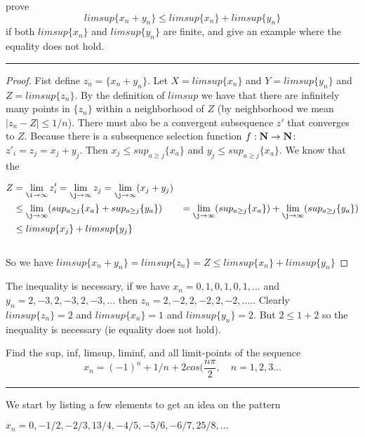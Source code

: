 \documentclass[11pt]{article}
\begin{document}
\newpage
{}

prove
$$limsup\{x_n + y_n\} \leq limsup\{x_n\} + limsup\{y_n\}$$
if both $limsup\{x_n\}$ and $limsup\{y_n\}$ are finite, and give an example where the equality does not hold.

\hrule

\begin{proof}

 Fist define $z_n = \{x_n + y_n\}$. Let $X = limsup\{x_n\}$ and $Y = limsup\{y_n\}$ and $Z = limsup\{z_n\}$. By the definition of $limsup$ we have that there are infinitely many points in $\{z_n\}$ within a neighborhood of $Z$ (by neighborhood we mean $|z_n - Z| \leq 1/n$). There must also be a convergent subsequence  $z'$ that converges to $Z$. Because there is a subsequence selection function $f: \mathbf{N} \to \mathbf{N}$: $z'_i = z_j = x_j + y_j$. Then $x_j \leq sup_{a \geq j}\{x_a\}$ and $y_j \leq sup_{a \geq j}\{x_a\}$. We know that the 
 


\begin{align*}
Z &= \lim_{\i \to \infty} z'_i = \lim_{\j \to \infty} z_j = \lim_{\j \to \infty} (x_j + y_j) \\
&\leq \lim_{\j \to \infty} (sup_{a \geq j}\{x_a\} + sup_{a \geq j}\{y_a\})
&= \lim_{\j \to \infty} (sup_{a \geq j}\{x_a\}) + \lim_{\j \to \infty} (sup_{a \geq j}\{y_a\}) \\
&\leq limsup\{x_j\} + limsup\{y_j\}
\end{align*}
 
$$$$

So we have $limsup\{x_n + y_n\} = limsup\{z_n\} = Z \leq limsup\{x_n\} + limsup\{y_n\}$
\end{proof}

The inequality is necessary, if we have $x_n = 0, 1, 0, 1, 0, 1, ...$ and $y_n = 2, -3, 2, -3, 2, -3, ...$ then $z_n = 2, -2, 2, -2, 2, -2, ....$. Clearly $limsup\{z_n\} = 2$ and $limsup\{x_n\} = 1$ and $limsup\{y_n\} = 2$. But $2 \leq 1 + 2$ so the inequality is necessary (ie equality does not hold).





\newpage
{}
Find the sup, inf, limsup, liminf, and all limit-points of the sequence 
$$x_n = (-1)^n + 1/n + 2cos(\frac{n\pi}{2}, \quad n = 1,2,3...$$
\hrule

We start by listing a few elements to get an idea on the pattern

$x_n = 0, -1/2,-2/3,13/4,-4/5,-5/6,-6/7,25/8,...$
\end{document}
